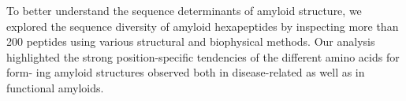 % 
% 
% 



To better understand the sequence determinants of amyloid structure, we explored the sequence diversity of amyloid hexapeptides by inspecting more than 200 peptides using various
structural and biophysical methods.
Our analysis highlighted the strong
position-specific tendencies of the different amino acids for form-
ing amyloid structures observed both in disease-related as well as
in functional amyloids.

